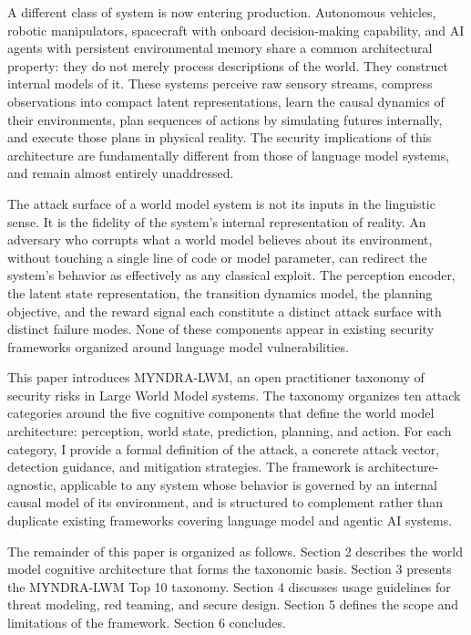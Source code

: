 \documentclass[11pt,a4paper]{article}
\begin{document}
A different class of system is now entering production. Autonomous vehicles, robotic manipulators, spacecraft with onboard decision-making capability, and AI agents with persistent environmental memory share a common architectural property: they do not merely process descriptions of the world. They construct internal models of it. These systems perceive raw sensory streams, compress observations into compact latent representations, learn the causal dynamics of their environments, plan sequences of actions by simulating futures internally, and execute those plans in physical reality. The security implications of this architecture are fundamentally different from those of language model systems, and remain almost entirely unaddressed.

The attack surface of a world model system is not its inputs in the linguistic sense. It is the fidelity of the system's internal representation of reality. An adversary who corrupts what a world model believes about its environment, without touching a single line of code or model parameter, can redirect the system's behavior as effectively as any classical exploit. The perception encoder, the latent state representation, the transition dynamics model, the planning objective, and the reward signal each constitute a distinct attack surface with distinct failure modes. None of these components appear in existing security frameworks organized around language model vulnerabilities.

This paper introduces MYNDRA-LWM, an open practitioner taxonomy of security risks in Large World Model systems. The taxonomy organizes ten attack categories around the five cognitive components that define the world model architecture: perception, world state, prediction, planning, and action. For each category, I provide a formal definition of the attack, a concrete attack vector, detection guidance, and mitigation strategies. The framework is architecture-agnostic, applicable to any system whose behavior is governed by an internal causal model of its environment, and is structured to complement rather than duplicate existing frameworks covering language model and agentic AI systems.

The remainder of this paper is organized as follows. Section 2 describes the world model cognitive architecture that forms the taxonomic basis. Section 3 presents the MYNDRA-LWM Top 10 taxonomy. Section 4 discusses usage guidelines for threat modeling, red teaming, and secure design. Section 5 defines the scope and limitations of the framework. Section 6 concludes.
\end{document}
